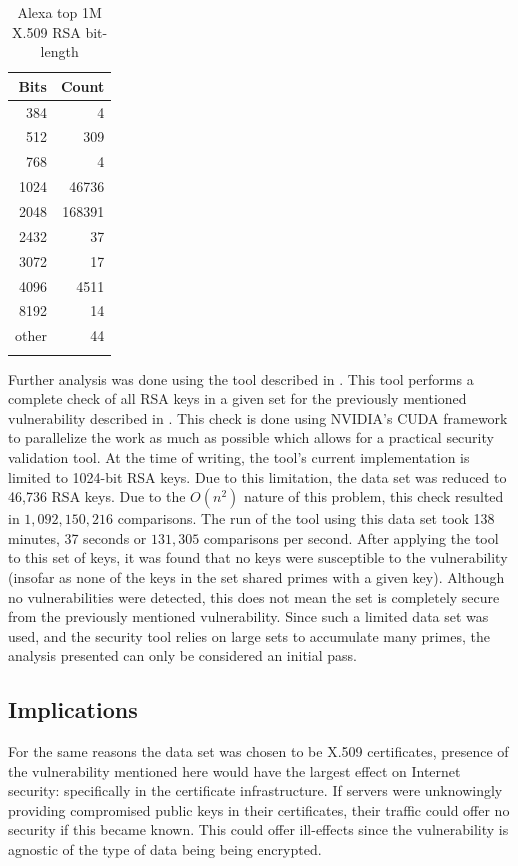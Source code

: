 \documentclass[smallextended]{svjour3}       %
\begin{document}
\begin{table}
\centering
\caption{Alexa top 1M X.509 RSA bit-length}
\begin{tabular}{|r|r|}\hline
\textbf{Bits} & \textbf{Count}\\\hline
384 & 4 \\ \hline
512 & 309 \\ \hline
768 & 4 \\ \hline
1024 & 46736 \\ \hline
2048 & 168391 \\ \hline
2432 & 37 \\ \hline
3072 & 17 \\ \hline
4096 & 4511 \\ \hline
8192 & 14 \\ \hline
other & 44 \\ \hline
\label{tab:bits}
\end{tabular}
\end{table}

Further analysis was done using the tool described in
\cite{scharfglass2012breaking}. This tool performs a complete check of all
RSA keys in a given set for the previously mentioned vulnerability described
in \cite{lenstra2012ron}. This check is done using NVIDIA's CUDA framework to
parallelize the work as much as possible which allows for a practical security
validation tool. At the time of writing, the tool's current implementation is
limited to 1024-bit RSA keys. Due to this limitation, the data set was
reduced to 46,736 RSA keys. Due to the $O(n^2)$ nature of this problem,
this check resulted in $1,092,150,216$ comparisons. The run of the tool using
this data set took 138 minutes, 37 seconds or $131,305$ comparisons per second.
After applying the tool to this set of keys, it was found that no keys were
susceptible to the vulnerability (insofar as none of the keys in the set
shared primes with a given key). Although no vulnerabilities were detected,
this does not mean the set is completely secure from the previously mentioned
vulnerability. Since such a limited data set was used, and the security tool
relies on large sets to accumulate many primes, the analysis presented can
only be considered an initial pass.

\subsection{Implications}
\label{subsec:implications}
For the same reasons the data set was chosen to be X.509 certificates, presence
of the vulnerability mentioned here would have the largest effect on Internet
security: specifically in the certificate infrastructure. If servers were
unknowingly providing compromised public keys in their certificates, their
traffic could offer no security if this became known. This could offer
ill-effects since the vulnerability is agnostic of the type of data being
being encrypted.
\end{document}
